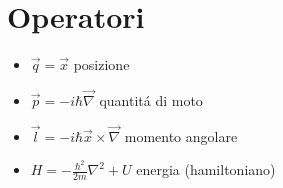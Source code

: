 \documentclass[a4paper]{article}
\begin{document}
        \section{Operatori}
            \begin{itemize}
                \item $\vec{q}=\vec{x}$ posizione
                \item $\vec{p}=-i\hbar\vec{\nabla}$ quantit\'a di moto
                \item $\vec{l}=-i\hbar\vec{x}\times\vec{\nabla}$ momento angolare
                \item $H=-\frac{\hbar^2}{2m}\nabla^2+U$ energia (hamiltoniano)
            \end{itemize}
\end{document}
